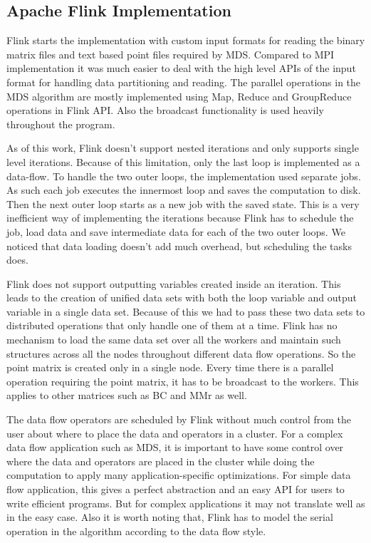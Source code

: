 \documentclass[conference]{IEEEtran}
\begin{document}
\subsection{Apache Flink Implementation}

Flink starts the implementation with custom input formats for reading the binary matrix files and text based point files required by MDS. Compared to MPI implementation it was much easier to deal with the high level APIs of the input format for handling data partitioning and reading. The parallel operations in the MDS algorithm are mostly implemented using Map, Reduce and GroupReduce operations in Flink API. Also the broadcast functionality is used heavily throughout the program.

As of this work, Flink doesn't support nested iterations and only supports single level iterations. Because of this limitation, only the last loop is implemented as a data-flow. To handle the two outer loops, the implementation used separate jobs. As such each job executes the innermost loop and saves the computation to disk. Then the next outer loop starts as a new job with the saved state. This is a very inefficient way of implementing the iterations because Flink has to schedule the job, load data and save intermediate data for each of the two outer loops. We noticed that data loading doesn't add much overhead, but scheduling the tasks does.

Flink does not support outputting variables created inside an iteration. This leads to the creation of unified data sets with both the loop variable and output variable in a single data set. Because of this we had to pass these two data sets to distributed operations that only handle one of them at a time. Flink has no mechanism to load the same data set over all the workers and maintain such structures across all the nodes throughout different data flow operations. So the point matrix is created only in a single node. Every time there is a parallel operation requiring the point matrix, it has to be broadcast to the workers. This applies to other matrices such as BC and MMr as well.

The data flow operators are scheduled by Flink without much control from the user about where to place the data and operators in a cluster. For a complex data flow application such as MDS, it is important to have some control over where the data and operators are placed in the cluster while doing the computation to apply many application-specific optimizations. For simple data flow application, this gives a perfect abstraction and an easy API for users to write efficient programs. But for complex applications it may not translate well as in the easy case. Also it is worth noting that, Flink has to model the serial operation in the algorithm according to the data flow style.
\end{document}
